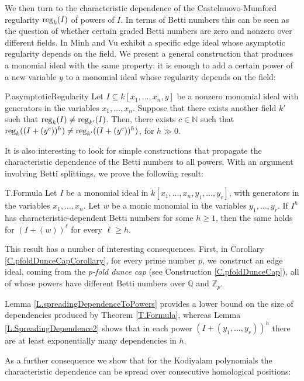 \documentclass[11pt,oneside]{amsart}
\theoremstyle{plain}
\theoremstyle{definition}
\newcommand{\reg}{{\rm reg}}
\newcommand{\Q}{\mathbb{Q}}
\newcommand{\Z}{\mathbb{Z}}
\begin{document}
We then turn to the characteristic dependence of the Castelnuovo-Mumford regularity $\reg_k(I)$ of powers of $I$. In terms of Betti numbers this can be seen as the question of whether certain graded Betti numbers are zero and nonzero over different fields. In \cite[Remark 5.3]{MV21} Minh and Vu exhibit a specific edge ideal whose asymptotic regularity depends on the field. We present a general construction that produces a monomial ideal with the same property: it is enough to add a certain power of a new variable $y$ to a monomial ideal whose regularity depends on the field:

\begin{repproposition}{P.asymptoticRegularity}
Let $I \subseteq k[x_1,\dots,x_n,y]$ be a nonzero monomial ideal with generators in the variables $x_1,\dots,x_n$. Suppose that there exists another field $k'$ such that $\reg_{k}(I) \neq \reg_{k'}(I)$. Then, there exists $c \in \mathbb{N}$ such that $\reg_{k} ((I+(y^c))^h) \neq \reg_{k'} ((I+(y^c))^h)$, for $h \gg 0$.
\end{repproposition}

It is also interesting to look for simple constructions that propagate the characteristic dependence of the Betti numbers to all powers. With an argument involving Betti splittings, we prove the following result:

 \begin{reptheorem}{T.Formula}
Let $I$ be a monomial ideal in $k[x_1,\dots,x_n, y_1,\dots,y_r]$, with generators in the variables $x_1,\dots,x_n$. Let $w$ be a monic monomial in the variables $y_1,\dots,y_r$. If $I^h$ has characteristic-dependent Betti numbers for some $h \geq 1$, then the same holds for $(I +(w))^{\ell}$ for every $\ell \geq h$.
\end{reptheorem}

This result has a number of interesting consequences. First, in Corollary \ref{C.pfoldDunceCapCorollary}, for every prime number $p$, we construct an edge ideal, coming from the \textit{p-fold dunce cap} (see Construction \ref{C.pfoldDunceCap}), all of whose powers have different Betti numbers over $\Q$ and $\Z_p$.

Lemma \ref{L.spreadingDependenceToPowers} provides a lower bound on the size of dependencies produced by Theorem \ref{T.Formula}, whereas Lemma \ref{L.SpreadingDependence2} shows that in each power $(I + (y_1,\dots,y_r))^h$ there are at least exponentially many dependencies in $h$.

As a further consequence we show that for the Kodiyalam polynomials the characteristic dependence can be spread over consecutive homological positions:
\end{document}
